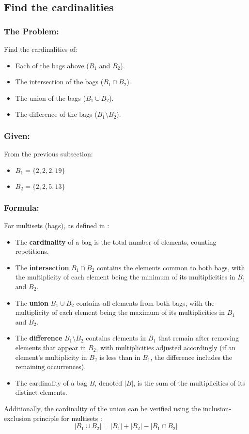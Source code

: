 \documentclass[12pt, a4paper, twoside]{report} %
\begin{document}
\subsection{Find the cardinalities}

\subsubsection*{The Problem:}
Find the cardinalities of:
\begin{itemize}
  \item Each of the bags above (\( B_1 \) and \( B_2 \)).
  \item The intersection of the bags (\( B_1 \cap B_2 \)).
  \item The union of the bags (\( B_1 \cup B_2 \)).
  \item The difference of the bags (\( B_1 \setminus B_2 \)).
\end{itemize}

\subsubsection*{Given:}
From the previous subsection:
\begin{itemize}
  \item \( B_1 = \{2, 2, 2, 19\} \)
  \item \( B_2 = \{2, 2, 5, 13\} \)
\end{itemize}

\subsubsection*{Formula:}
For multisets (bags), as defined in \cite{epp2020}:
\begin{itemize}
  \item The \textbf{cardinality} of a bag is the total number of elements, counting repetitions.
  \item The \textbf{intersection} \( B_1 \cap B_2 \) contains the elements common to both bags, with the multiplicity of each element being the minimum of its multiplicities in \( B_1 \) and \( B_2 \).
  \item The \textbf{union} \( B_1 \cup B_2 \) contains all elements from both bags, with the multiplicity of each element being the maximum of its multiplicities in \( B_1 \) and \( B_2 \).
  \item The \textbf{difference} \( B_1 \setminus B_2 \) contains elements in \( B_1 \) that remain after removing elements that appear in \( B_2 \), with multiplicities adjusted accordingly (if an element’s multiplicity in \( B_2 \) is less than in \( B_1 \), the difference includes the remaining occurrences).
  \item The cardinality of a bag \( B \), denoted \( |B| \), is the sum of the multiplicities of its distinct elements.
\end{itemize}
Additionally, the cardinality of the union can be verified using the inclusion-exclusion principle for multisets \cite{rosen2019}:
\[
|B_1 \cup B_2| = |B_1| + |B_2| - |B_1 \cap B_2|
\]
\end{document}
